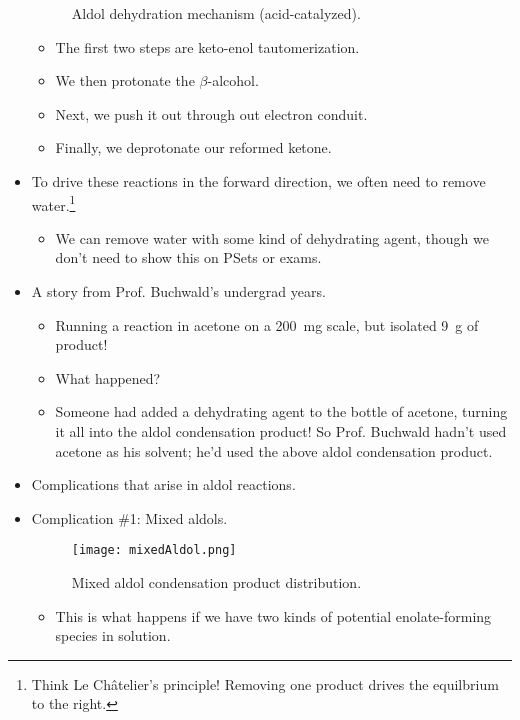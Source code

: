 \documentclass[../notes.tex]{subfiles}
\begin{document}
\begin{itemize}
\begin{figure}[h!]
        \caption{Aldol dehydration mechanism (acid-catalyzed).}
        \label{fig:aldolDehMechAcid}
    \end{figure}
    \begin{itemize}
        \item The first two steps are keto-enol tautomerization.
        \item We then protonate the $\beta$-alcohol.
        \item Next, we push it out through out electron conduit.
        \item Finally, we deprotonate our reformed ketone.
    \end{itemize}
    \item To drive these reactions in the forward direction, we often need to remove water.\footnote{Think Le Ch\^{a}telier's principle! Removing one product drives the equilbrium to the right.}
    \begin{itemize}
        \item We can remove water with some kind of dehydrating agent, though we don't need to show this on PSets or exams.
    \end{itemize}
    \item A story from Prof. Buchwald's undergrad years.
    \begin{itemize}
        \item Running a reaction in acetone on a \SI{200}{\milli\gram} scale, but isolated \SI{9}{\gram} of product!
        \item What happened?
        \item Someone had added a dehydrating agent to the bottle of acetone, turning it all into the aldol condensation product! So Prof. Buchwald hadn't used acetone as his solvent; he'd used the above aldol condensation product.
    \end{itemize}
    \item Complications that arise in aldol reactions.
    \pagebreak
    \item Complication \#1: Mixed aldols.
    \begin{figure}[h!]
        \centering
        \texttt{[image: mixedAldol.png]}
        \caption{Mixed aldol condensation product distribution.}
        \label{fig:mixedAldol}
    \end{figure}
    \begin{itemize}
        \item This is what happens if we have two kinds of potential enolate-forming species in solution.

\end{itemize}
\end{itemize}
\end{document}
